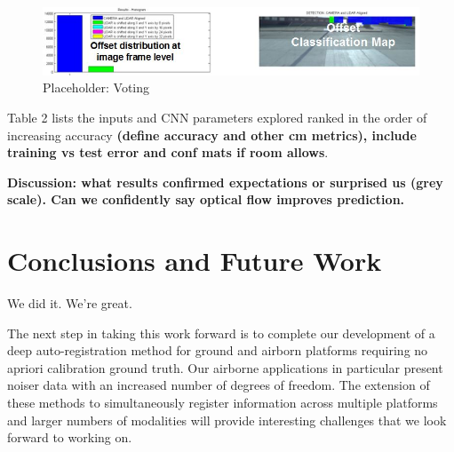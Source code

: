 \documentclass{article}
\begin{document}
\begin{figure}[htbp]
    \centering
        \includegraphics[scale=0.85]{Figures/Voting_5class.jpg}
    \caption{Placeholder: Voting}
    \label{fig:Figures_Voting}
\end{figure}

Table 2 lists the inputs and CNN parameters explored ranked in the order of increasing accuracy \textbf{(define accuracy and other cm metrics), include training vs test error and conf mats if room allows}.  

 \textbf{Discussion: what results confirmed expectations or surprised us (grey scale). Can we confidently say optical flow improves prediction. }



\section{Conclusions and Future Work} %
\label{sec:conclusions_and_future_work}
We did it. We're great.

The next step in taking this work forward is to complete our development of a deep auto-registration method for ground and airborn platforms requiring no apriori calibration ground truth.  Our airborne applications in particular present noiser data with an increased number of degrees of freedom. The extension of these methods to simultaneously register information across multiple platforms and larger numbers of modalities will provide interesting challenges that we look forward to working on. 






\end{document}
